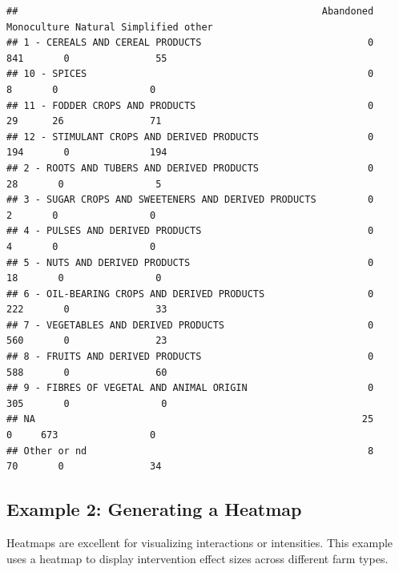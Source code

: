 \documentclass[
]{book}
\begin{document}
\begin{verbatim}
##                                                     Abandoned Monoculture Natural Simplified other
## 1 - CEREALS AND CEREAL PRODUCTS                             0         841       0               55
## 10 - SPICES                                                 0           8       0                0
## 11 - FODDER CROPS AND PRODUCTS                              0          29      26               71
## 12 - STIMULANT CROPS AND DERIVED PRODUCTS                   0         194       0              194
## 2 - ROOTS AND TUBERS AND DERIVED PRODUCTS                   0          28       0                5
## 3 - SUGAR CROPS AND SWEETENERS AND DERIVED PRODUCTS         0           2       0                0
## 4 - PULSES AND DERIVED PRODUCTS                             0           4       0                0
## 5 - NUTS AND DERIVED PRODUCTS                               0          18       0                0
## 6 - OIL-BEARING CROPS AND DERIVED PRODUCTS                  0         222       0               33
## 7 - VEGETABLES AND DERIVED PRODUCTS                         0         560       0               23
## 8 - FRUITS AND DERIVED PRODUCTS                             0         588       0               60
## 9 - FIBRES OF VEGETAL AND ANIMAL ORIGIN                     0         305       0                0
## NA                                                         25           0     673                0
## Other or nd                                                 8          70       0               34
\end{verbatim}

\subsection{Example 2: Generating a Heatmap}\label{example-2-generating-a-heatmap}

Heatmaps are excellent for visualizing interactions or intensities.
This example uses a heatmap to display intervention effect sizes across different farm types.
\end{document}
